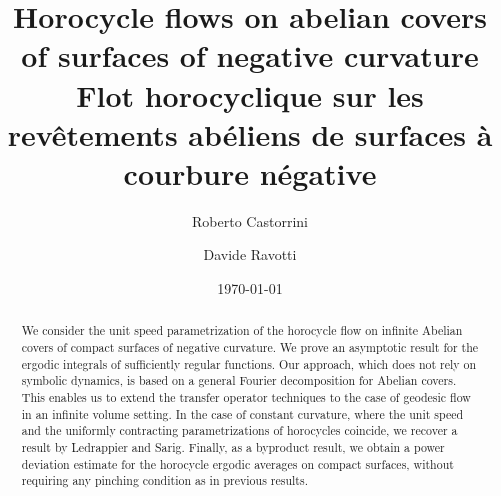 \documentclass[11pt,letterpaper]{amsart}
\date{\today}
\author{Roberto Castorrini}
\author{Davide Ravotti}
\title[Horocycle flows on abelian covers]
 {Horocycle flows on abelian covers of surfaces of negative curvature \\[0.5em]
 Flot horocyclique sur les rev\^etements ab\'eliens de surfaces \`a courbure n\'egative}
\theoremstyle{definition}
\begin{document}

\maketitle


\begin{abstract}
	We consider the unit speed parametrization of the horocycle flow on infinite Abelian covers of compact surfaces of negative curvature. We prove an asymptotic result for the ergodic integrals of sufficiently regular functions. 
	Our approach, which does not rely on symbolic dynamics, is based on a general Fourier decomposition for Abelian covers. This enables us to extend the transfer operator techniques to the case of geodesic flow in an infinite volume setting.
		In the case of constant curvature, where the unit speed and the uniformly contracting parametrizations of horocycles coincide, we recover a result by Ledrappier and Sarig.
	Finally, as a byproduct result, we obtain a power deviation estimate for the horocycle ergodic averages on compact surfaces, without requiring any pinching condition as in previous results.
\end{abstract}
\end{document}
